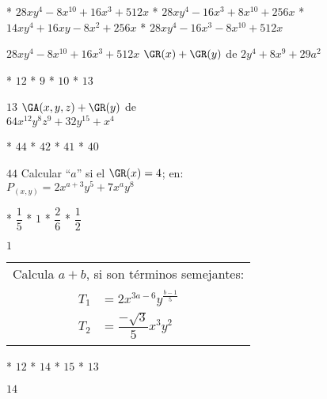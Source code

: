 \begin{enum}
	* $28xy^4-8x^{10}+16x^3+512x$
	* $28xy^4-16x^3+8x^{10}+256x$
	* $14xy^4+16xy-8x^2+256x$
	* $28xy^4-16x^3-8x^{10}+512x$
\end{enum}
$28xy^4-8x^{10}+16x^3+512x$
$\GR(x)+\GR(y)$ de $2y^4+8x^9+29a^2$
\begin{enum}
	* $12$
	* $9$
	* $10$
	* $13$
\end{enum}
$13$
$\GA(x,y,z)+\GR(y)$ de \\
$64x^{12}y^8z^9+32y^{15}+x^4$
\begin{enum}
	* $44$
	* $42$
	* $41$
	* $40$
\end{enum}
$44$
Calcular ``$a$'' si el $\GR(x)=4$; en: \\
$P_{(x,y)}=2x^{a+3}y^5+7x^ay^8$
\begin{task}
	* $\dfrac{1}{5}$
	* $1$
	* $\dfrac{2}{6}$
	* $\dfrac{1}{2}$
\end{task}
$1$
\begin{tabular}{c}
	Calcula $a+b$, si son términos semejantes: \\
	$\begin{aligned}
		T_1&=2x^{3a-6}y^{\frac{b-1}{5}} \\
		T_2&=\dfrac{-\sqrt{3}}{5}x^3y^2
	\end{aligned}$
\end{tabular}
\begin{enum}
	* $12$
	* $14$
	* $15$
	* $13$
\end{enum}
$14$

